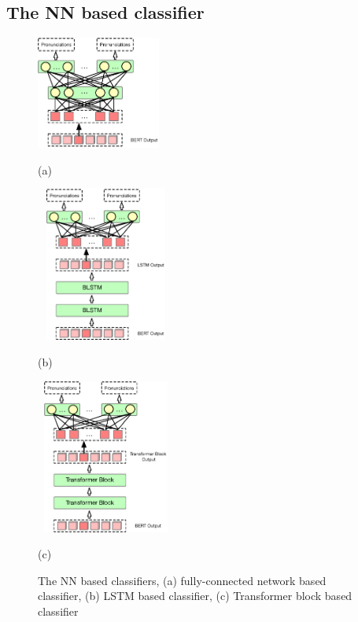 \documentclass[a4paper]{article}
\begin{document}
\subsection{The NN based classifier}
\begin{figure}[htbp]

	\begin{minipage}[t]{0.3\linewidth}
		\centering
		\centerline{\includegraphics[width=1.6in]{pics3/FC22.eps}}
		\centerline{(a) \quad\quad}\medskip
		
	\end{minipage}%
	\begin{minipage}[t]{0.3\linewidth}
		\centering
		\includegraphics[width=1.8in, height=2.0in]{pics3/lstm2.eps}
		\centerline{(b)\quad\quad}\medskip
		
	\end{minipage}
	\begin{minipage}[t]{0.3\linewidth}
		\centering
		\includegraphics[width=1.8in, height=2.0in]{pics3/sa2.eps}
		\centerline{(c)\quad\quad}\medskip
		
	\end{minipage}
\caption{The NN based classifiers, (a) fully-connected network based classifier, (b) LSTM based classifier, (c) Transformer block based classifier }
\label{fig:cls}
\end{figure}
\end{document}
